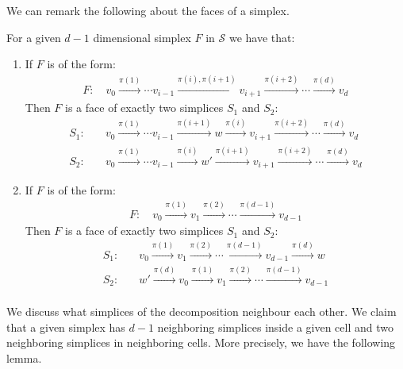 We can remark the following about the faces of a simplex.
\begin{remark}\label{rem:faces_of_simplex}
	For a given $d-1$ dimensional simplex $F$ in $\mathcal{S}$ we have that:
	\begin{enumerate}
		\item If $F$ is of the form:
		      \begin{align*}
			      F: \quad v_0 \xrightarrow{\pi(1)}  \cdots v_{i-1} \xrightarrow{\pi(i), \pi(i+1)} v_{i+1} \xrightarrow{\pi(i+2)} \cdots \xrightarrow{\pi(d)} v_d
		      \end{align*}
		      Then $F$ is a face of exactly two simplices $S_1$ and $S_2$:
		      \begin{align*}
			      S_1: \quad & v_0 \xrightarrow{\pi(1)} \cdots v_{i-1} \xrightarrow{\pi(i+1)} w \xrightarrow{\pi(i)} v_{i + 1} \xrightarrow{\pi(i+2)} \cdots \xrightarrow{\pi(d)} v_d  \\
			      S_2: \quad & v_0 \xrightarrow{\pi(1)} \cdots v_{i-1} \xrightarrow{\pi(i)} w' \xrightarrow{\pi(i+1)} v_{i + 1} \xrightarrow{\pi(i+2)} \cdots \xrightarrow{\pi(d)} v_d
		      \end{align*}\label{rem:face_inside_cell}
		\item If $F$ is of the form:
		      \begin{align*}
			      F: \quad v_0 \xrightarrow{\pi(1)} v_1 \xrightarrow{\pi(2)} \cdots \xrightarrow{\pi(d-1)} v_{d-1}
		      \end{align*}
		      Then $F$ is a face of exactly two simplices $S_1$ and $S_2$:
		      \begin{align*}
			      S_1: & \quad v_0 \xrightarrow{\pi(1)} v_1 \xrightarrow{\pi(2)} \cdots \xrightarrow{\pi(d-1)} v_{d-1} \xrightarrow{\pi(d)} w  \\
			      S_2: & \quad w' \xrightarrow{\pi(d)} v_0 \xrightarrow{\pi(1)} v_1 \xrightarrow{\pi(2)} \cdots \xrightarrow{\pi(d-1)} v_{d-1} \\
		      \end{align*}\label{rem:face_border_cell}
	\end{enumerate}
\end{remark}

We discuss what simplices of the decomposition neighbour each other. We claim that a given simplex has $d-1$ neighboring simplices inside a given cell and two neighboring simplices in neighboring cells. More precisely, we have the following lemma.

